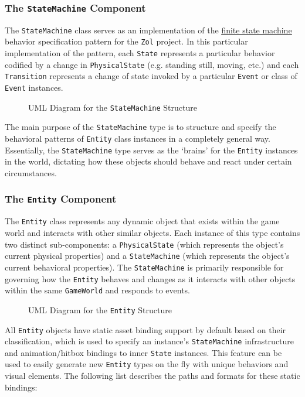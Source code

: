 \documentclass{article}
\newcommand{\classname}[1] {\texttt{#1}}
\newcommand{\projectname}[0] {\texttt{Zol} }
\newcommand{\hreffsm}[1] {\href{http://en.wikipedia.org/wiki/Finite-state\_machine}{{\color{blue}\underline{#1}}}}
\newcommand{\insertdiagram}[2]
{
	\begin{figure}[H]
		\centering
		\fbox{\texttt{[image: figures/\#1]}}
		\caption{UML Diagram for the \classname{#1} Structure}
	\end{figure}
}
\begin{document}
			\subsubsection[\classname{StateMachine}]{The \classname{StateMachine} Component}
			The \classname{StateMachine} class serves as an implementation of
			the \hreffsm{finite state machine} behavior specification pattern for
			the \projectname project.
			In this particular implementation of the pattern, each \classname{State}
			represents a particular behavior codified by a change in
			\classname{PhysicalState} (e.g. standing still, moving, etc.)
			and each \classname{Transition} represents a change of state invoked
			by a particular \classname{Event} or class of \classname{Event} instances.

			\insertdiagram{StateMachine}{2.0in}

			The main purpose of the \classname{StateMachine} type is to structure
			and specify the behavioral patterns of \classname{Entity} class
			instances in a completely general way.  Essentially, the
			\classname{StateMachine} type serves as the `brains' for the
			\classname{Entity} instances in the world, dictating how these
			objects should behave and react under certain circumstances.

			\subsubsection[\classname{Entity}]{The \classname{Entity} Component}
			The \classname{Entity} class represents any dynamic object that
			exists within the game world and interacts with other similar
			objects.  Each instance of this type contains two distinct
			sub-components: a \classname{PhysicalState} (which represents the
			object's current physical properties) and a \classname{StateMachine}
			(which represents the object's current behavioral properties).
			The \classname{StateMachine} is primarily responsible for governing
			how the \classname{Entity} behaves and changes as it interacts with
			other objects within the same \classname{GameWorld} and responds to
			events.

			\insertdiagram{Entity}{2.0in}

			All \classname{Entity} objects have static asset binding support
			by default based on their classification, which is used to specify
			an instance's \classname{StateMachine} infrastructure and animation/hitbox
			bindings to inner \classname{State} instances.  This feature can
			be used to easily generate new \classname{Entity} types on the fly
			with unique behaviors and visual elements.  The following list
			describes the paths and formats for these static bindings:
\end{document}
